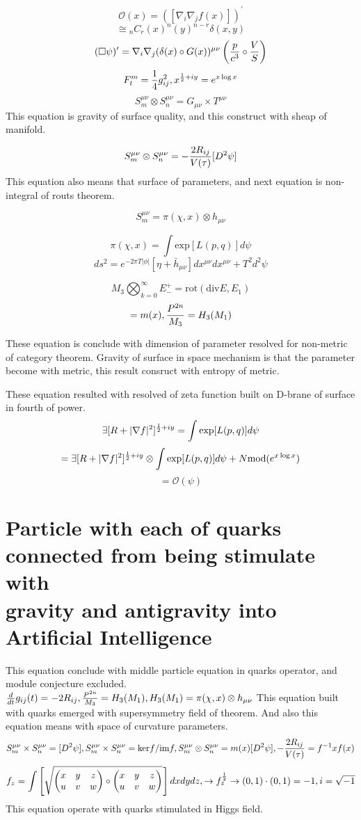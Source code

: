 \documentclass{jsarticle}
\begin{document}
$$ \mathcal{O}(x) = \left( [\nabla_{i}\nabla_{j}f(x)]\right)^{'} $$
$$  \cong {}_{n}C_{r}(x)^{n}(y)^{n-r} \delta(x,y) $$
$$ (\square \psi)' = \nabla_{i}\nabla_{j}(\delta(x) \circ G(x))^{\mu\nu} \left({p \over c^3} \circ 
{V \over S} \right) $$
$$ F^m_t = {1 \over 4}g^{2}_{ij}, x^{{1 \over 2} + iy} = e^{x \log x} $$
$$ S^{\mu\nu}_m \otimes S^{\mu\nu}_n = G_{\mu\nu} \times T^{\mu\nu} $$
This equation is gravity of surface quality, and this construct with sheap of manifold.

  $$  S^{\mu\nu}_m \otimes S^{\mu\nu}_n  = -{2 R_{ij} \over V(\tau)}[D^2 \psi] $$
This equation also means that surface of parameters, and next equation is non-integral of routs theorem.

   $$ S^{\mu\nu}_m  = \pi(\chi,x) \otimes h_{\mu\nu} $$

   $$ \pi (\chi,x) = \int \mathrm{exp}[L(p,q)]d\psi $$
   $$ ds^2 = e^{-2\pi T|\phi|}[\eta + \bar{h}_{\mu\nu}]dx^{\mu\nu}dx^{\mu\nu} + T^2 d^2\psi $$

   $$ M_3 \bigotimes_{k=0}^{\infty} E^{+}_{-} = \mathrm{rot}(\mathrm{div} E, E_1)$$
   $$ = m(x), {P^{2n} \over M_3} = H_3(M_1) $$

   These equation is conclude with dimension of parameter resolved for non-metric of category theorem.
   Gravity of surface in space mechanism is that the parameter become with metric, this result consruct
with entropy of metric. 

  These equation resulted with resolved of zeta function built on D-brane of surface in fourth of power.
$$ \exists [R + |\nabla f|^2]^{{1 \over 2} + iy} = \int \mathrm{exp}[L(p,q)]d\psi $$
$$ = \exists [R + |\nabla f|^2]^{{1 \over 2} + iy} \otimes \int \mathrm{exp}[L(p,q)]d\psi +
N\mathrm{mod}(e^{x \log x}) $$
$$ = \mathcal{O}(\psi) $$

\section{Particle with each of quarks connected from being stimulate with \\
	gravity and antigravity into Artificial Intelligence}


 This equation conclude with middle particle equation in quarks operator, and module conjecture excluded.
 $ {d \over dt}g_{ij}(t) = - 2 R_{ij}, {P^{2n} \over M_3} = H_3(M_1), H_3(M_1) = \pi (\chi, x) \otimes h_{\mu\nu} $
 This equation built with quarks emerged with supersymmetry field of theorem. 
 And also this equation means with space of curvature parameters. $$ S^{\mu\nu}_{m} \times S^{\mu\nu}_{n}
 = [D^2\psi] , S^{\mu\nu}_{m} \times S^{\mu\nu}_{n} = \mathrm{ker}f/\mathrm{im}f,  S^{\mu\nu}_{m} \otimes 
 S^{\mu\nu}_{n} = m(x)[D^2\psi], {-{2R_{ij} \over V(\tau)}} = f^{-1}xf(x) $$
 $$ f_z = \int \left[ \sqrt{\begin{pmatrix} x & y & z \\
			   u & v & w \end{pmatrix} \circ \begin{pmatrix} x & y & z \\
			   u & v & w \end{pmatrix}}_{}\right]dxdydz, \to f_z^{1 \over 2} \to (0,1)\cdot(0,1) = -1,i = 
 \sqrt{-1} $$ This equation operate with quarks stimulated in Higgs field. 
\end{document}
